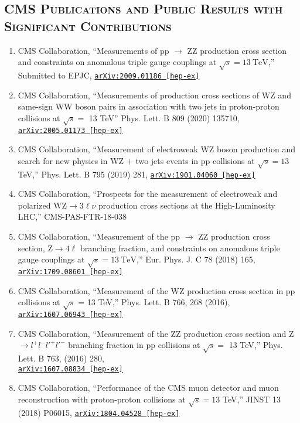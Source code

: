 \documentclass[10pt]{res} %
\begin{document}
\begin{resume}
\section{\textsc{CMS Publications and Public Results with Significant Contributions}}
\begin{enumerate}
  \item CMS Collaboration, ``Measurements of pp $\rightarrow$ ZZ production cross section and constraints on anomalous triple gauge couplings at $\sqrt{s} = 13~\mathrm{TeV}$,'' Submitted to EPJC, \href{https://arxiv.org/abs/2009.01186}{\texttt{arXiv:2009.01186 [hep-ex]}}
  \item CMS Collaboration, ``Measurements of production cross sections of WZ and same-sign WW boson pairs in association with two jets in proton-proton collisions at $\sqrt{s} =$ 13 TeV'' Phys. Lett. B 809 (2020) 135710, \href{https://arxiv.org/abs/2005.01173}{\texttt{arXiv:2005.01173 [hep-ex]}}
  \item CMS Collaboration, ``Measurement of electroweak WZ boson production and search for new physics in WZ $+$ two jets events in pp collisions at $\sqrt{s}=13$\,TeV,'' Phys. Lett. B 795 (2019) 281, \href{https://arxiv.org/abs/1901.04060} {\texttt{arXiv:1901.04060 [hep-ex]}}
  \item CMS Collaboration, ``Prospects for the measurement of electroweak and polarized $\mathrm{WZ}\to3\ell\nu$ production cross sections at the High-Luminosity LHC,'' CMS-PAS-FTR-18-038
  \item CMS Collaboration, ``Measurement of the pp $\rightarrow$ ZZ production cross section, $\mathrm{Z} \to 4\ell$ branching fraction, and constraints on anomalous triple gauge couplings at $\sqrt{s} = 13~\mathrm{TeV}$,'' Eur. Phys. J. C 78 (2018) 165, \href{https://arxiv.org/abs/1709.08601}{\texttt{arXiv:1709.08601 [hep-ex]}}
  \item CMS Collaboration, ``Measurement of the WZ production cross section in pp collisions at $\sqrt{s}$ = 13 TeV,''
Phys. Lett. B 766, 268 (2016), \href{https://arxiv.org/abs/1607.06943}{\texttt{arXiv:1607.06943 [hep-ex]}}
  \item CMS Collaboration, ``Measurement of the ZZ production cross section and Z $\rightarrow l^{+}l^{-}l'^{+}l'^{-}$ branching fraction in pp collisions at $\sqrt{s} =$ 13 TeV,''
Phys. Lett. B 763, (2016) 280, \\ \href{https://arxiv.org/abs/1607.08834} {\texttt{arXiv:1607.08834 [hep-ex]}}
  \item CMS Collaboration, ``Performance of the CMS muon detector and muon reconstruction with proton-proton collisions at $\sqrt{s} = 13$ TeV,''
JINST 13 (2018) P06015, \href{https://arxiv.org/abs/1804.04528} {\texttt{arXiv:1804.04528 [hep-ex]}}
\end{enumerate}


\end{resume}
\end{document}
